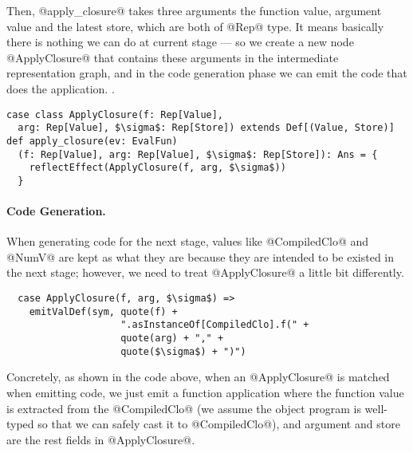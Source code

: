 Then, @apply_closure@ takes three arguments the function value, argument value and the latest store, 
which are both of @Rep@ type. It means basically there is nothing we can do at current stage --- 
so we create a new node @ApplyClosure@ that contains these arguments in the intermediate representation graph,
and in the code generation phase we can emit the code that does the application. .

\begin{lstlisting}
case class ApplyClosure(f: Rep[Value], 
  arg: Rep[Value], $\sigma$: Rep[Store]) extends Def[(Value, Store)]
def apply_closure(ev: EvalFun)
  (f: Rep[Value], arg: Rep[Value], $\sigma$: Rep[Store]): Ans = {
    reflectEffect(ApplyClosure(f, arg, $\sigma$))
  }
\end{lstlisting}

\paragraph{Code Generation.}
When generating code for the next stage, values like @CompiledClo@ and @NumV@ are kept as what they are because
they are intended to be existed in the next stage; however, we need to treat @ApplyClosure@ a little bit 
differently.

\begin{lstlisting}
  case ApplyClosure(f, arg, $\sigma$) => 
    emitValDef(sym, quote(f) + 
                    ".asInstanceOf[CompiledClo].f(" + 
                    quote(arg) + "," + 
                    quote($\sigma$) + ")")
\end{lstlisting}

Concretely, as shown in the code above, when an @ApplyClosure@ is matched when emitting code, we just 
emit a function application where the function value is extracted from the @CompiledClo@
(we assume the object program is well-typed so that we can safely cast it to @CompiledClo@), 
and argument and store are the rest fields in @ApplyClosure@.
